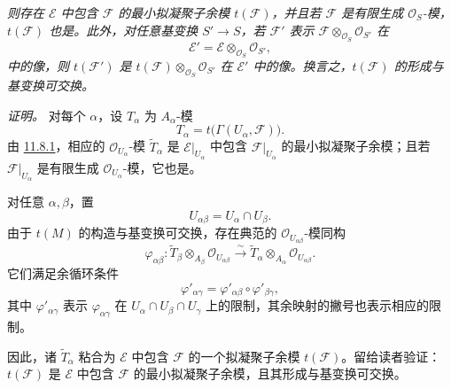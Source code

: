 \emph{则存在 \(\mathcal E\) 中包含 \(\mathcal F\) 的最小拟凝聚子余模 \(t(\mathcal F)\)，并且若 \(\mathcal F\) 是有限生成 \(\mathcal O_S\)-模，\(t(\mathcal F)\) 也是。此外，对任意基变换 \(S'\to S\)，若 \(\mathcal F'\) 表示 \(\mathcal F\otimes_{\mathcal O_S}\mathcal O_{S'}\) 在}
\[
  \mathcal E'
    =\mathcal E\otimes_{\mathcal O_S}\mathcal O_{S'},
\]
\emph{中的像，则 \(t(\mathcal F')\) 是 \(t(\mathcal F)\otimes_{\mathcal O_S}\mathcal O_{S'}\) 在 \(\mathcal E'\) 中的像。换言之，\(t(\mathcal F)\) 的形成与基变换可交换。}

\emph{证明。}
对每个 \(\alpha\)，设 \(T_\alpha\) 为 \(A_\alpha\)-模
\[
  T_\alpha=t\bigl(\Gamma(U_\alpha,\mathcal F)\bigr).
\]
由 \hyperref[concl:sga3-VIB-11.8.1-i]{11.8.1}\textup{}，相应的 \(\mathcal O_{U_\alpha}\)-模 \(\widetilde T_\alpha\) 是 \(\mathcal E|_{U_\alpha}\) 中包含 \(\mathcal F|_{U_\alpha}\) 的最小拟凝聚子余模；且若 \(\mathcal F|_{U_\alpha}\) 是有限生成 \(\mathcal O_{U_\alpha}\)-模，它也是。

对任意 \(\alpha,\beta\)，置
\[
  U_{\alpha\beta}=U_\alpha\cap U_\beta.
\]
由于 \(t(M)\) 的构造与基变换可交换，存在典范的 \(\mathcal O_{U_{\alpha\beta}}\)-模同构
\label{form:sga3-VIB-11.9-gluing}%
\[
  \varphi_{\alpha\beta}:
  \widetilde T_\beta
    \otimes_{A_\beta}\mathcal O_{U_{\alpha\beta}}
  \xrightarrow{\ \sim\ }
  \widetilde T_\alpha
    \otimes_{A_\alpha}\mathcal O_{U_{\alpha\beta}}.
\]
它们满足余循环条件
\[
  \varphi'_{\alpha\gamma}
    =\varphi'_{\alpha\beta}\circ\varphi'_{\beta\gamma},
\]
其中 \(\varphi'_{\alpha\gamma}\) 表示 \(\varphi_{\alpha\gamma}\) 在 \(U_\alpha\cap U_\beta\cap U_\gamma\) 上的限制，其余映射的撇号也表示相应的限制。

因此，诸 \(\widetilde T_\alpha\) 粘合为 \(\mathcal E\) 中包含 \(\mathcal F\) 的一个拟凝聚子余模 \(t(\mathcal F)\)。留给读者验证：\(t(\mathcal F)\) 是 \(\mathcal E\) 中包含 \(\mathcal F\) 的最小拟凝聚子余模，且其形成与基变换可交换。

